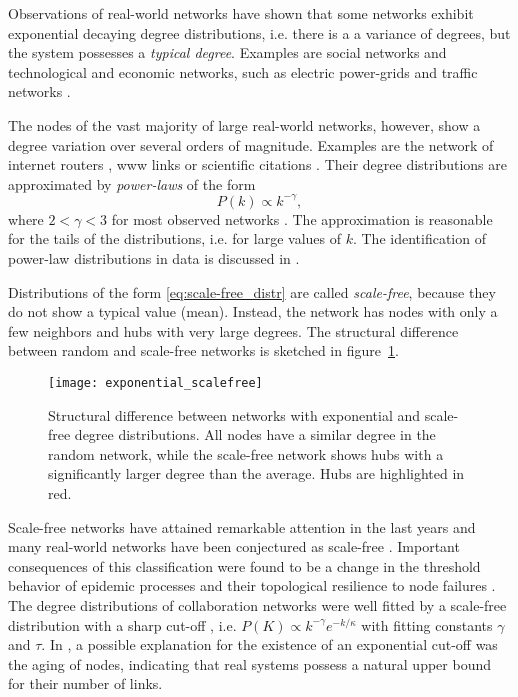 Observations of real-world networks have shown that some networks exhibit exponential decaying degree distributions, i.e. there is a a variance of degrees, but the system possesses a \emph{typical degree}.
Examples are social networks and technological and economic networks, such as electric power-grids and traffic networks \citep{Amaral:2000,indian_railway}.

The nodes of the vast majority of large real-world networks, however, show a degree variation over several orders of magnitude.
Examples are the network of internet routers \citep{Faloutsos:1999}, www links \citep{Barabasi99} or scientific citations \citep{Price:1965}.
Their degree distributions are approximated by \emph{power-laws} of the form
\begin{equation}\label{eq:scale-free_distr}
P(k) \propto k^{-\gamma } ,
\end{equation}
where $2<\gamma <3$ for most observed networks \citep{all_scale_free_are_sparse,Newman2003}.
The approximation is reasonable for the tails of the distributions, i.e. for large values of $k$.
The identification of power-law distributions in data is discussed in \citep{Clauset:2009}.

Distributions of the form \eqref{eq:scale-free_distr} are called \emph{scale-free}, because they do not show a typical value (mean).
Instead, the network has nodes with only a few neighbors and hubs with very large degrees.
The structural difference between random and scale-free networks is sketched in figure~\ref{fig:random_scalefree}.
%
\begin{figure}[htbp]
\begin{center}
\texttt{[image: exponential\_scalefree]}
\caption{Structural difference between networks with exponential and scale-free degree distributions.
All nodes have a similar degree in the random network, while the scale-free network shows hubs with a significantly larger degree than the average.
Hubs are highlighted in red.}
\label{fig:random_scalefree}
\end{center}
\end{figure}

Scale-free networks have attained remarkable attention in the last years and many real-world networks have been conjectured as scale-free \citep{Newman2003,Barabasi99}.
Important consequences of this classification were found to be a change in the threshold behavior of epidemic processes \citep{Pastor-Satorras_vespi:2001} and their topological resilience to node failures \citep{Albert:2000}.
The degree distributions of collaboration networks were well fitted by a scale-free distribution with a sharp cut-off \citep{Newman:2001p,Albert:2000}, i.e. $P(K)\propto k^{-\gamma }e^{-k/\kappa }$ with fitting constants $\gamma $ and $\tau $.
In \citep{Amaral:2000}, a possible explanation for the existence of an exponential cut-off was the aging of nodes, indicating that real systems possess a natural upper bound for their number of links.




